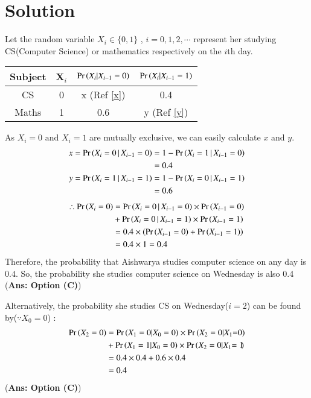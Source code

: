 \documentclass[journal,12pt,twocolumn]{IEEEtran}
\begin{document}
\section{Solution}
Let the random variable $X_i \in \{ 0,1 \}$ , $i=0,1,2, \cdots$ represent her studying CS(Computer Science) or mathematics respectively on the $i$th day.
\begin{table}[h]
    \centering
    \begin{tabular}[width=\columnwidth]{|c|c|c|c|}
         \hline
        \textbf{Subject}&\textbf{X$_i$}&\textbf{$\Pr\left(X_i | X_{i-1}=0\right)$} &\textbf{$\Pr\left(X_i | X_{i-1}=1\right)$} \\
        \hline    
         CS&0&x (Ref \eqref{x})&0.4\\
         \hline
         Maths&1&0.6&y (Ref \eqref{y})\\
         \hline
    \end{tabular}
\end{table}
\par As $X_i=0 \text{ and } X_i=1$ are mutually exclusive, we can easily calculate $x$ and $y$.
\begin{align}
    x=\pr{X_{i} = 0 \,|\, X_{i-1}=0} &= 1-\pr{X_{i} = 1 \,|\, X_{i-1}=0}\nonumber
    \\&= 0.4 \label{x}\\
    y=\pr{X_{i} = 1 \,|\, X_{i-1}=1} &= 1-\pr{X_{i} = 0 \,|\, X_{i-1}=1}\nonumber
    \\&= 0.6 \label{y}
\end{align} 
\begin{align}
    \therefore \Pr\left(X_i=0\right)&=\Pr\left(X_{i} = 0 \,|\, X_{i-1}=0\right)\times \Pr\left( X_{i-1}=0\right)\nonumber\\
    &+ \Pr\left(X_{i} = 0 \,|\, X_{i-1}=1\right)\times \Pr\left( X_{i-1}=1\right)  \nonumber\\
&=0.4\times\left( \Pr\left( X_{i-1}=0\right)+\Pr\left( X_{i-1}=1\right) \right) \nonumber\\
&=0.4 \times 1 = 0.4
\end{align}
Therefore, the probability that Aishwarya studies computer science on any day is $0.4$. So, the probability she studies computer science on Wednesday is also 0.4\\
 (\textbf{Ans: Option (C)})\\
\par Alternatively, the probability she studies CS on Wednesday($i=2$) can be found by($\because X_0=0$) :
\begin{align}
    \pr{X_2=0}&= \pr{X_1=0|X_0=0}\times \pr{X_2=0|X_1\hspace{-0.1cm}=\hspace{-0.1cm}0}\nonumber\\
    &+  \pr{X_1=1|X_0=0}\times \pr{X_2=0|X_1\hspace{-0.1cm}=1\hspace{-0.1cm}}\\
     &= 0.4\times 0.4 + 0.6\times0.4\\
     &=0.4
 \end{align}
 (\textbf{Ans: Option (C)})
\end{document}
